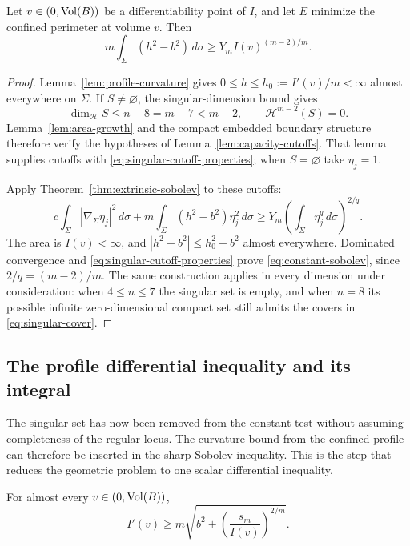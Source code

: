 \begin{lemma}
\label{lem:constant-test}
Let $v\in(0,\operatorname{Vol}(B))$ be a differentiability point of $I$, and let
$E$ minimize the confined perimeter at volume $v$.  Then
\begin{equation}
\label{eq:constant-sobolev}
 m\int_\Sigma(h^2-b^2)\,d\sigma
 \ge Y_m I(v)^{(m-2)/m}.
\end{equation}
\end{lemma}

\begin{proof}
Lemma~\ref{lem:profile-curvature} gives
$0\le h\le h_0:=I'(v)/m<\infty$ almost everywhere on $\Sigma$.
If $S\ne\varnothing$, the singular-dimension bound gives
\[
 \dim_{\mathcal H}S\le n-8=m-7<m-2,
 \qquad \mathcal H^{m-2}(S)=0.
\]
Lemma~\ref{lem:area-growth} and the compact embedded boundary structure
therefore verify the hypotheses of Lemma~\ref{lem:capacity-cutoffs}.
That lemma supplies cutoffs with \eqref{eq:singular-cutoff-properties};
when $S=\varnothing$ take $\eta_j=1$.

Apply Theorem~\ref{thm:extrinsic-sobolev} to these cutoffs:
\[
 c\int_\Sigma|\nabla_\Sigma\eta_j|^2\,d\sigma
 +m\int_\Sigma(h^2-b^2)\eta_j^2\,d\sigma
 \ge Y_m\left(\int_\Sigma\eta_j^q\,d\sigma\right)^{2/q}.
\]
The area is $I(v)<\infty$, and
$|h^2-b^2|\le h_0^2+b^2$ almost everywhere.  Dominated convergence
and \eqref{eq:singular-cutoff-properties} prove
\eqref{eq:constant-sobolev}, since $2/q=(m-2)/m$.
The same construction applies in every dimension under consideration:
when $4\le n\le7$ the singular set is empty, and when $n=8$ its
possible infinite zero-dimensional compact set still admits the
covers in \eqref{eq:singular-cover}.
\end{proof}

\subsection{The profile differential inequality and its integral}

The singular set has now been removed from the constant test without
assuming completeness of the regular locus. The curvature bound from
the confined profile can therefore be inserted in the sharp Sobolev
inequality. This is the step that reduces the geometric problem to one
scalar differential inequality.

\begin{proposition}
\label{prop:profile-ode}
For almost every $v\in(0,\operatorname{Vol}(B))$,
\begin{equation}
\label{eq:profile-differential}
 I'(v)\ge m\sqrt{b^2+\left(\frac{s_m}{I(v)}\right)^{2/m}}.
\end{equation}
\end{proposition}


